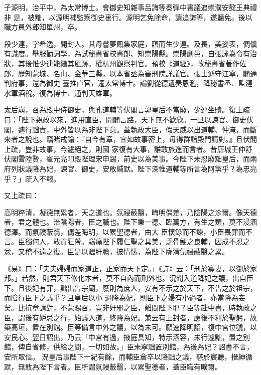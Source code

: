 \begin{pinyinscope}
 子源明，治平中，為太常博士。會御史知雜事呂誨等奏彈中書議追崇濮安懿王典禮非
 是，被黜，以源明補監察御史裏行。源明乞免除命，請追誨等，遂聽免。後以職方員外郎知單州，卒。



 段少連，字希逸，開封人。其母嘗夢鳳集家庭，寤而生少連。及長，美姿表，倜儻有識度。舉服勤詞學，為試秘書省校書郎、知崇陽縣。崇陽劇邑，自張詠為令有治狀，其後惟少連能繼其風跡。權杭州觀察判官。預校《道經》，改秘書省著作佐郎，歷知蒙城、名山、金華三縣，以本省丞為審刑院詳議官。張士遜守江寧，闢通判府事，還為御史
 臺推直官，遷太常博士。論劉從德遺奏恩濫，降秘書丞、監漣水軍酒稅。復為博士、通判天雄軍。



 太后崩，召為殿中侍御史，與孔道輔等伏閣言郭皇后不當廢，少連坐贖。復上疏曰：「陛下親政以來，進用直臣，開闢言路，天下無不歡欣。一旦以諫官、御史伏閣，遽行黜責，中外皆以為非陛下意。蓋執政大臣，假天威以出道輔、仲淹，而斷來者之說也。竊睹戒諭：『自今有章，宜如故事密上，毋得群詣殿門請對。』且伏閣上疏，豈非故事，今遽絕之，則國
 家復有大事，誰敢旅進而言者。昔唐城王仲舒伏閣雪陸贄，崔元亮叩殿陛理宋申錫，前史以為美事。今陛下未忍廢黜皇后，而兩府列狀議降為妃，諫官、御史，安敢緘默。陛下深惟道輔等所言為阿黨乎？為忠亮乎？」疏入不報。



 又上疏曰：



 高明粹清，凝德無累者，天之道也。氛祲蔽翳，晦明偶差，乃陰陽之沴爾。像天德者，君之體也。治陰陽者，臣之職也。陛下秉一德、臨萬方，有生之類，莫不浸涵德澤。而氛祲蔽翳，偶差晦明，以累聖德者，由大
 臣懷錄而不諫，小臣畏罪而不言。臣獨何人，敢貢狂瞽。竊痛陛下履仁聖之具美，乏骨鯁之良輔，因成不忍之忿，又稽不遠之復。臣是以瀝肝膽，披情愫，為陛下廓清氛祲蔽翳之累。



 《易》曰：「夫夫婦婦而家道正，正家而天下定。」《詩》云：「刑於寡妻，以御於家邦。」若然，則君天下修化本者，莫不自內而刑外也。況聞入道降妃之議，出自臣下。且後妃有罪，黜出告宗廟，廢則為庶人，安有不示之於天下，不告之於祖宗，而陰行臣下之議乎？且皇后以小
 過降為妃，則臣下之婦有小過者，亦當降為妾矣。比抗章請對，不蒙賜召，豈非奸邪之臣，離間陛下耶？臣等赴中書，時執政之臣，謂後有妒忌之行，始議入道，終降為妃。兼云有上封者，慮後不利於聖躬，故築高垣，置在別館。臣等備言中外之議，以為未可。願速降明詔，復中宮位號，以安民心。翌日詔出，乃云「中宮有過，掖庭具知，特示涵容，未行遽黜，置之別館，俾自省修，供給之間，一切如故。」臣未寧黜置別館，為後為妃？詔書不言，安所取信。
 況皇后事陛下一紀有餘，而輔臣倉卒以降黜之議，惑於宸聽，搢紳循默，無敢為陛下言者。臣所謂氛祲蔽翳，以累聖德者，蓋臣職有曠爾。




\end{pinyinscope}
